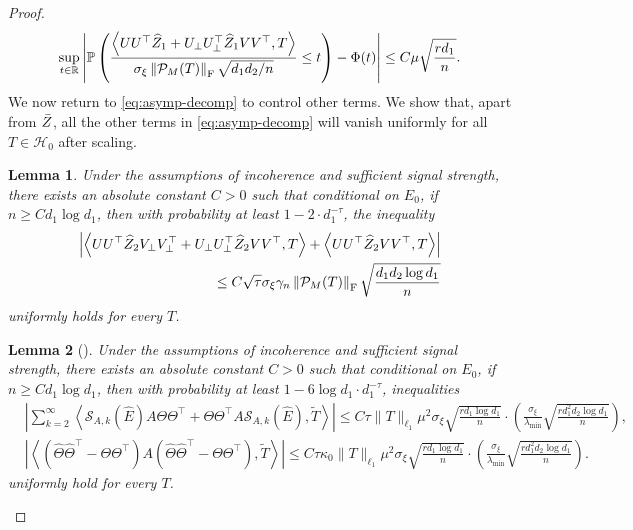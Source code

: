 \documentclass[12pt]{article}
\newcommand{\tF}{{\rm F}}
\newcommand{\abs}[1]{\left\lvert#1\right\rvert}
\newcommand{\norm}[1]{\left\lVert#1\right\rVert}
\newcommand{\PP}{\mathbb{P}}
\newcommand{\R}{\mathbb{R}}
\newcommand{\cH}{\mathcal{H}}
\newcommand{\cP}{\mathcal{P}}
\def\PP{{\mathbb P}}
\newtheorem{Lemma}{Lemma}
\theoremstyle{plain}
\begin{document}
\begin{proof}
\begin{equation}\label{eq:B-E-bound}
    \begin{aligned}
       \sup_{t\in \R} \abs{ \PP \left(\frac{\left\langle U U^\top \widehat{Z}_1 + U_{\perp} U^\top_{\perp} \widehat{Z}_1 VV^\top, T \right\rangle}{\sigma_{\xi} \norm{\cP_M(T) }_{\rm F}  \sqrt{d_1 d_2/n}  } \le t  \right) - \Phi(t)}\le C \mu \sqrt{\frac{r d_1}{n}}.
    \end{aligned}
\end{equation}
We now return to \eqref{eq:asymp-decomp} to control other terms. We show that, apart from $\Bar{Z}$, all the other terms in \eqref{eq:asymp-decomp} will vanish uniformly for all $T\in\cH_0$ after scaling.

\begin{Lemma}\label{lemma:asymp-vanishing-part-1}
        Under the assumptions of incoherence and sufficient signal strength, there exists an absolute constant $C>0$ such that conditional on $E_0$, if $n \geq C d_1 \log d_1$, then with probability at least $1-2 \cdot d_1^{-\tau}$, the inequality 
$$
\begin{aligned}
     \abs{\left\langle U U^\top \widehat{Z}_2 V_{\perp} V_{\perp}^\top + U_{\perp} U^\top_{\perp} \widehat{Z}_2 VV^\top, T \right\rangle +\left\langle UU^\top \widehat{Z}_2VV^\top, T\right\rangle}\\  \leq C \sqrt{\tau} \sigma_{\xi} \gamma_{n} \norm{\cP_M(T) }_\tF  \sqrt{\frac{ d_1 d_2 \log d_1}{n}}
\end{aligned}
$$
uniformly holds for every $T$.
\end{Lemma}

\begin{Lemma}[\cite{xia2021statistical}]\label{lemma:asymp-vanishing-part-2}
        Under the assumptions of incoherence and sufficient signal strength, there exists an absolute constant $C>0$ such that conditional on $E_0$, if $n \geq C d_1 \log d_1$, then with probability at least $1-6\log d_1 \cdot d_1^{-\tau}$, inequalities 
$$
\begin{aligned}
    &\abs{\sum_{k=2}^{\infty} \left\langle \mathcal{S}_{A, k}\left(\widehat{E}\right) A \Theta \Theta^{\top}+\Theta \Theta^{\top} A \mathcal{S}_{A, k}\left(\widehat{E}\right) , \widetilde{T} \right\rangle} \le C \tau\|T\|_{\ell_1} \mu_{ }^2 \sigma_{\xi} \sqrt{\frac{r d_1 \log d_1}{n}} \cdot\left(\frac{\sigma_{\xi}}{\lambda_{\min}}  \sqrt{\frac{r d_1^2 d_2 \log d_1}{n}}\right), \\
    &  \abs{\left\langle \left(\widehat{\Theta} \widehat{\Theta}^{\top}-\Theta \Theta^{\top}\right) A\left(\widehat{\Theta} \widehat{\Theta}^{\top}-\Theta \Theta^{\top}\right), \widetilde{T} \right\rangle} \le C\tau\kappa_0 \|T\|_{\ell_1} \mu_{ }^2 \sigma_{\xi} \sqrt{\frac{r d_1 \log d_1}{n}} \cdot\left(\frac{\sigma_{\xi}}{\lambda_{\min}}  \sqrt{\frac{r d_1^2 d_2 \log d_1}{n}}\right) .
\end{aligned}
$$
uniformly hold for every $T$.


\end{Lemma}
\end{proof}
\end{document}
